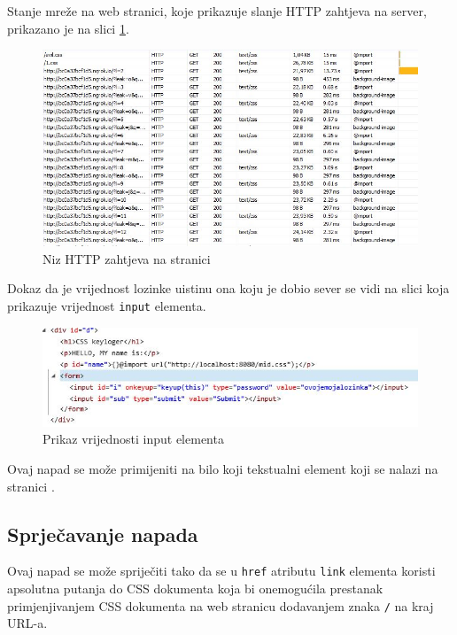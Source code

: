 \documentclass[12pt, oneside, onecolumn]{book}
\begin{document}
{Stanje mreže na web stranici, koje prikazuje slanje HTTP zahtjeva na server, prikazano je na slici \ref{fig:css_net}.

\begin{figure}[H]
	\begin{center}
		\includegraphics[width=\textwidth]{css_net.jpg}
		\caption{Niz HTTP zahtjeva na stranici} \label{fig:css_net}
	\end{center}
\end{figure}

Dokaz da je vrijednost lozinke uistinu ona koju je dobio sever se vidi na slici koja prikazuje vrijednost \texttt{input} elementa.

\begin{figure}[H]
	\begin{center}
		\includegraphics[width=\textwidth]{css_pv.jpg}
		\caption{Prikaz vrijednosti input elementa} \label{fig:css_pv}
	\end{center}
\end{figure}

Ovaj napad se može primijeniti na bilo koji tekstualni element koji se nalazi na stranici \cite{cssnapad1}.

\subsection{Sprječavanje napada}
Ovaj napad se može spriječiti tako da se u \texttt{href} atributu \texttt{link} elementa koristi apsolutna putanja do CSS dokumenta koja bi onemogućila prestanak primjenjivanjem CSS dokumenta na web stranicu dodavanjem znaka \texttt{/} na kraj URL-a.

}
\end{document}
